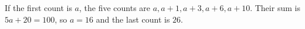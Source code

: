 If the first count is $a$, the five counts are $a,a+1,a+3,a+6,a+10$. Their sum is $5a+20=100$, so $a=16$ and the last count is $\boxed{26}$.
